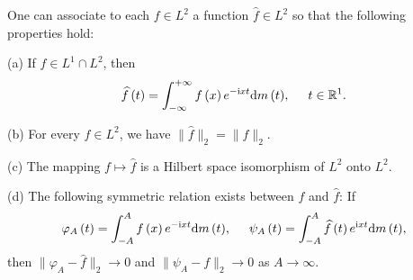 \begin{theorem}
One can associate to each $f\in L^2$ a function $\widehat{f}\in L^2$ so that the following properties hold:\par
(a) If $f\in L^1\cap L^2$, then 
$$
\widehat{f}\left( t \right) =\int_{-\infty}^{+\infty}{f\left( x \right) e^{-\mathrm{i}xt}\mathrm{d}m\left( t \right)},\hspace{0.5cm}t\in \mathbb{R} ^1.
$$\par
(b) For every $f\in L^2$, we have $\|\widehat{f}\|_2=\|f\|_2$.\par
(c) The mapping $f\mapsto\widehat{f}$ is a Hilbert space isomorphism of $L^2$ onto $L^2$.\par
(d) The following symmetric relation exists between $f$ and $\widehat{f}$: If 
$$
\varphi _A\left( t \right) =\int_{-A}^A{f\left( x \right) e^{-\mathrm{i}xt}\mathrm{d}m\left( t \right)},\hspace{0.5cm}\psi _A\left( t \right) =\int_{-A}^A{\widehat{f}\left( t \right) e^{\mathrm{i}xt}\mathrm{d}m\left( t \right)},
$$
then $\|\varphi_A-\widehat{f}\|_2\to 0$ and $\|\psi_A-f\|_2\to 0$ as $A\to\infty$.
\end{theorem}
